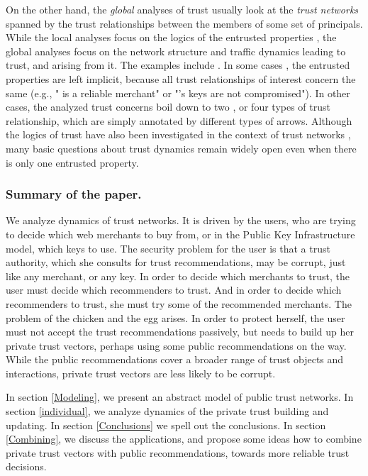 \documentclass{llncs}
\newcommand{\indiv}{private}
\begin{document}
On the other hand, the {\em global\/} analyses of trust usually look at the {\em trust networks\/} spanned by the trust relationships  between the members  of some set of principals. While the local analyses focus on the logics of the entrusted properties , the global analyses focus on the network structure and traffic dynamics leading to trust, and arising from it. The examples include \cite{BlazeM:Decentralized,Guha-Tomkins,LevienR,MaurerU:Trust,ReiterM:Metric}. In some cases \cite{Guha-Tomkins}, the entrusted properties are left implicit, because all trust relationships of interest concern the same  (e.g.,  " is a reliable merchant" or  "'s keys are not compromised"). In other cases, the analyzed trust concerns boil down to two \cite{BBK,LevienR}, or four \cite{MaurerU:Trust} types of trust relationship, which are simply annotated by different types of arrows. Although the logics of trust have also been investigated in the context of  trust networks  \cite{JosangA:PGP,JosangA:Trustnet06}, many  basic questions about trust dynamics remain widely open even when there is only one entrusted property.

\subsubsection*{Summary of the paper.}
We analyze dynamics of trust networks. It is driven by the users, who are trying to decide which web merchants to buy from, or in the Public Key Infrastructure model, which keys to use. The security problem for the user is that a trust authority, which she consults for trust recommendations, may be corrupt, just like any merchant, or any key. In order to decide which merchants to trust, the user must decide which recommenders to trust. And in order to decide which recommenders to trust, she must try some of the recommended merchants. The problem of the chicken and the egg arises. In order to protect herself, the user must not accept the trust recommendations passively, but  needs to build up her {\indiv}  trust vectors, perhaps using some public recommendations on the way. While the public recommendations cover a broader range of trust objects and interactions, {\indiv} trust vectors are less likely to be corrupt.

In section \ref{Modeling}, we present an abstract model of public trust networks. In section \ref{individual}, we analyze dynamics of the {\indiv} trust building and updating. In section \ref{Conclusions} we spell out the conclusions. In section \ref{Combining}, we discuss the applications, and propose some ideas how to combine {\indiv} trust vectors with public recommendations, towards more reliable trust decisions.
\end{document}
